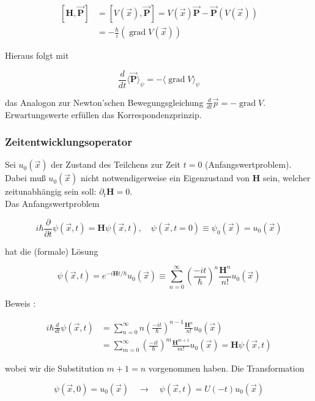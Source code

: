 \documentclass[10pt, letterpaper]{article}
\begin{document}
$$
\begin{aligned}
{[\mathbf{H}, \overrightarrow{\mathbf{P}}] } & =[V(\vec{x}), \overrightarrow{\mathbf{P}}]=V(\vec{x}) \overrightarrow{\mathbf{P}}-\overrightarrow{\mathbf{P}}(V(\vec{x})) \\
& =-\frac{\hbar}{i}(\operatorname{grad} V(\vec{x}))
\end{aligned}
$$

Hieraus folgt mit

$$
\frac{d}{d t}\langle\overrightarrow{\mathbf{P}}\rangle_{\psi}=-\langle\operatorname{grad} V\rangle_{\psi}
$$

das Analogon zur Newton'schen Bewegungsgleichung $\frac{d}{d t} \vec{p}=-\operatorname{grad} V$.\\
Erwartungswerte erfüllen das Korrespondenzprinzip.

\subsubsection*{Zeitentwicklungsoperator}
Sei $u_{0}(\vec{x})$ der Zustand des Teilchens zur Zeit $t=0$ (Anfangswertproblem). Dabei muß $u_{0}(\vec{x})$ nicht notwendigerweise ein Eigenzustand von $\mathbf{H}$ sein, welcher zeitunabhängig sein soll: $\partial_{t} \mathbf{H}=0$.\\
Das Anfangswertproblem

$$
i \hbar \frac{\partial}{\partial t} \psi(\vec{x}, t)=\mathbf{H} \psi(\vec{x}, t), \quad \psi(\vec{x}, t=0) \equiv \psi_{0}(\vec{x})=u_{0}(\vec{x})
$$

hat die (formale) Lösung

$$
\psi(\vec{x}, t)=e^{-i \mathbf{H} t / \hbar} u_{0}(\vec{x}) \equiv \sum_{n=0}^{\infty}\left(\frac{-i t}{\hbar}\right)^{n} \frac{\mathbf{H}^{n}}{n!} u_{0}(\vec{x})
$$

Beweis :

$$
\begin{aligned}
i \hbar \frac{d}{d t} \psi(\vec{x}, t) & =\sum_{n=0}^{\infty} n\left(\frac{-i t}{\hbar}\right)^{n-1} \frac{\mathbf{H}^{n}}{n!} u_{0}(\vec{x}) \\
& =\sum_{m=0}^{\infty}\left(\frac{-i t}{\hbar}\right)^{m} \frac{\mathbf{H}^{m+1}}{m!} u_{0}(\vec{x})=\mathbf{H} \psi(\vec{x}, t)
\end{aligned}
$$

wobei wir die Substitution $m+1=n$ vorgenommen haben. Die Transformation

$$
\psi(\vec{x}, 0)=u_{0}(\vec{x}) \quad \rightarrow \quad \psi(\vec{x}, t)=U(-t) u_{0}(\vec{x})
$$
\end{document}
